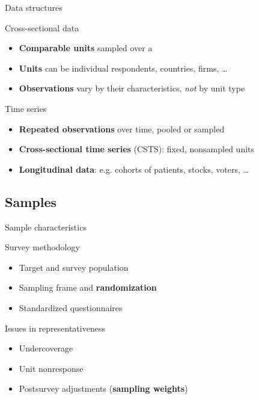 \documentclass[t]{beamer}
\begin{document}
	\begin{frame}[t]{Data structures}

	\begin{block}{Cross-sectional data}

		\begin{itemize}
			\item \textbf{Comparable units} sampled over a 
			\item \textbf{Units} can be individual respondents, countries, firms, …
			\item \textbf{Observations} vary by their characteristics, \textit{not} by unit type
		\end{itemize}

  \end{block}

	\begin{block}{Time series}

		\begin{itemize}
			\item \textbf{Repeated observations} over time, pooled or sampled
			\item \textbf{Cross-sectional time series} (CSTS): fixed, nonsampled units
			\item \textbf{Longitudinal data}: e.g. cohorts of patients, stocks, voters, …
		\end{itemize}

  \end{block}

	\end{frame}

  \subsection{Samples}
	
	\begin{frame}[t]{Sample characteristics}

	\begin{block}{Survey methodology}

		\begin{itemize}
			\item Target and survey population
			\item Sampling frame and \textbf{randomization}
			\item Standardized questionnaires
		\end{itemize}
    
  \end{block}

	\begin{alertblock}{Issues in representativeness}

		\begin{itemize}
			\item Undercoverage
			\item Unit nonresponse
			\item Postsurvey adjustments (\textbf{sampling weights})
		\end{itemize}
    
  \end{alertblock}

	\end{frame}
\end{document}

